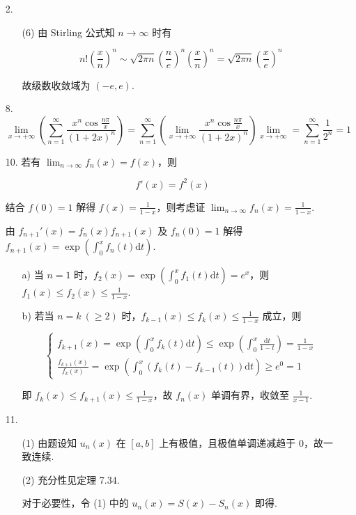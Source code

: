 \documentclass[oneside]{ctexbook} %
\begin{document}
\begin{enumerate}
    \item[2.]
    \begin{enumerate}
        \item[(6)]
        由 Stirling 公式知 $n \to \infty$ 时有

        $$
        n! \left( \frac x n \right)^n \sim \sqrt{2 \pi n} \left( \frac n e \right)^n \left( \frac x n \right)^n = \sqrt{2 \pi n} \left( \frac x e \right)^n
        $$

        故级数收敛域为 $(-e, e)$.
    \end{enumerate}
    \item[8.]
    $$
    \lim_{x \to +\infty} \left( \sum_{n=1}^{\infty} \frac{x^n \cos \frac {n\pi} x}{(1+2x)^n} \right) = \sum_{n=1}^{\infty} \left( \lim_{x \to +\infty} \frac{x^n \cos \frac {n\pi} x}{(1+2x)^n} \right) \lim_{x \to +\infty} = \sum_{n=1}^{\infty} \frac 1 {2^n} = 1
    $$
    \item[10.]
    若有 $\displaystyle \lim_{n \to \infty} f_n(x) = f(x)$，则

    $$
    f'(x) = f^2(x)
    $$

    结合 $f(0) = 1$ 解得 $f(x) = \frac 1 {1 - x}$，则考虑证 $\displaystyle \lim_{n \to \infty} f_n(x) = \frac 1 {1 - x}$.

    由 $f_{n+1}'(x) = f_n(x) f_{n+1}(x)$ 及 $f_n(0) = 1$ 解得 $\displaystyle f_{n+1}(x) = \exp\left( \int_0^x f_n(t) \mathrm dt \right)$.

    \begin{enumerate}
        \item[a)]
        当 $n = 1$ 时，$\displaystyle f_2(x) = \exp\left( \int_0^x f_1(t) \mathrm dt \right) = e^x$，则 $f_1(x) \leqslant f_2(x) \leqslant \frac 1 {1 - x}$.
        \item[b)]
        若当 $n = k \ (\geqslant 2)$ 时，$f_{k-1}(x) \leqslant f_k(x) \leqslant \frac 1 {1 - x}$ 成立，则

        $$
        \begin{cases}
            f_{k+1}(x) = \exp\left( \int_0^x f_k(t) \mathrm dt \right) \leqslant \exp\left( \int_0^x \frac{\mathrm dt}{1 - t} \right) = \frac 1 {1 - x} \\
            \frac{f_{k+1}(x)}{f_k(x)} = \exp\left( \int_0^x \left( f_k(t) - f_{k-1}(t) \right) \mathrm dt \right) \geqslant e^0 = 1
        \end{cases}
        $$

        即 $f_k(x) \leqslant f_{k+1}(x) \leqslant \frac 1 {1 - x}$，故 $f_n(x)$ 单调有界，收敛至 $\frac 1 {x - 1}$.
    \end{enumerate}

    \item[11.]
    \begin{enumerate}
        \item[(1)]
        由题设知 $u_n(x)$ 在 $[a, b]$ 上有极值，且极值单调递减趋于 $0$，故一致连续.
        \item[(2)]
        充分性见定理 7.34.

        对于必要性，令 (1) 中的 $u_n(x) = S(x) - S_n(x)$ 即得.
    \end{enumerate}
\end{enumerate}
\end{document}
